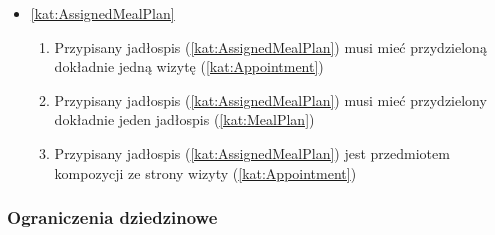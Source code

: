 \begin{itemize}[label={\textbf{Reguły dla}}, wide, labelwidth=!, labelindent=0pt]
    \item\ref{kat:AssignedMealPlan}\mynobreakpar
    \begin{enumerate}[label={\textbf{REG/5/\protect\twodigits{\arabic{enumi}}}}, wide, labelwidth=!, align=left, leftmargin=3cm, resume]
        \item Przypisany jadłospis (\ref{kat:AssignedMealPlan}) musi mieć przydzieloną dokładnie jedną wizytę (\ref{kat:Appointment})
        \item Przypisany jadłospis (\ref{kat:AssignedMealPlan}) musi mieć przydzielony dokładnie jeden jadłospis (\ref{kat:MealPlan})
        \item Przypisany jadłospis (\ref{kat:AssignedMealPlan}) jest przedmiotem kompozycji ze strony wizyty (\ref{kat:Appointment})
    \end{enumerate}
\end{itemize}

\subsubsection{Ograniczenia dziedzinowe}\label{subsubsec:database:appointments:restrictions}

